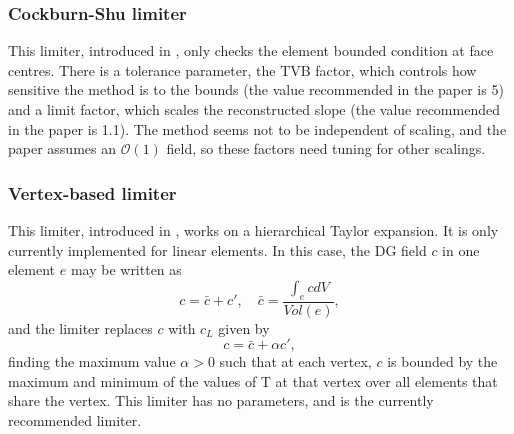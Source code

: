 \subsubsection{Cockburn-Shu limiter}
This limiter, introduced in \cite{cockburn2001}, only checks the element
bounded condition at face centres. There is a tolerance parameter, the
TVB factor, which controls how sensitive the method is to the bounds
(the value recommended in the paper is 5) and a limit factor, which
scales the reconstructed slope (the value recommended in the paper is
1.1). The method seems not to be independent of scaling, and the paper
assumes an $\mathcal{O}(1)$ field, so these factors need tuning for
other scalings.

\subsubsection{Vertex-based limiter}
This limiter, introduced in \cite{Ku2010}, works on a hierarchical
Taylor expansion. It is only currently implemented for linear elements.
In this case, the DG field $c$ in one element $e$ may be written as
\[
c = \bar{c} + c', \quad \bar{c} = \frac{\int_e c dV}{Vol(e)},
\]
and the limiter replaces $c$ with $c_L$ given by
\[
c = \bar{c} + \alpha c',
\]
finding the maximum value $\alpha>0$ such that at each vertex, $c$ is
bounded by the maximum and minimum of the values of T at that vertex
over all elements that share the vertex.  This limiter has no
parameters, and is the currently recommended limiter.

